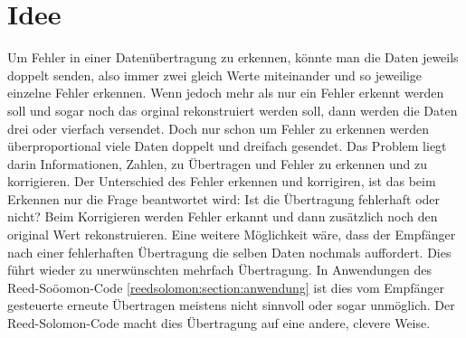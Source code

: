 %
%
\section{Idee
\label{reedsolomon:section:idee}}
Um Fehler in einer Datenübertragung zu erkennen, könnte man die Daten jeweils doppelt senden,
    also immer zwei gleich Werte miteinander und so jeweilige einzelne Fehler erkennen.
Wenn jedoch mehr als nur ein Fehler erkennt werden soll und sogar noch das orginal rekonstruiert werden soll,
dann werden die Daten drei oder vierfach versendet.
Doch nur schon um Fehler zu erkennen werden überproportional viele Daten doppelt und dreifach gesendet.
Das Problem liegt darin Informationen, Zahlen, 
    zu Übertragen und Fehler zu erkennen und zu korrigieren.
Der Unterschied des Fehler erkennen und korrigiren, ist das beim Erkennen nur die Frage beantwortet wird: Ist die Übertragung fehlerhaft oder nicht?
Beim Korrigieren werden Fehler erkannt und dann zusätzlich noch den original Wert rekonstruieren.
Eine weitere Möglichkeit wäre, dass der Empfänger nach einer fehlerhaften Übertragung die selben Daten nochmals auffordert.
Dies führt wieder zu unerwünschten mehrfach Übertragung.
In Anwendungen des Reed-Soöomon-Code  \ref{reedsolomon:section:anwendung}
ist dies vom Empfänger gesteuerte erneute Übertragen meistens nicht sinnvoll oder sogar unmöglich.
Der Reed-Solomon-Code macht dies Übertragung auf eine andere, clevere Weise.

